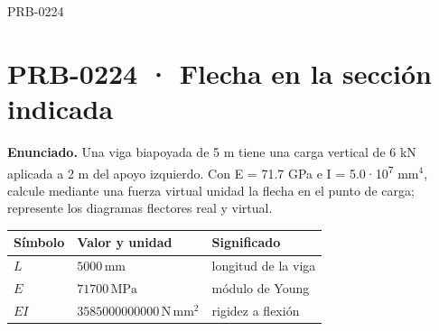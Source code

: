 \Needspace{.3\textheight}

\begin{studiumworked}{PRB-0224}

\section{PRB-0224 · Flecha en la sección indicada}

\textbf{Enunciado.} Una viga biapoyada de 5 m tiene una carga vertical de 6 kN aplicada a 2 m del apoyo izquierdo. Con E = 71.7 GPa e I = 5.0·10\textsuperscript{7} mm$^4$, calcule mediante una fuerza virtual unidad la flecha en el punto de carga; represente los diagramas flectores real y virtual.

\par\medskip\noindent\begin{tabular}{@{}p{.18\linewidth}p{.26\linewidth}p{.48\linewidth}@{}}
\toprule Símbolo & Valor y unidad & Significado\\\midrule
$L$ & $5000\,\mathrm{mm}$ & longitud de la viga\\
$E$ & $71700\,\mathrm{MPa}$ & módulo de Young\\
$EI$ & $3585000000000\,\mathrm{N\,mm^2}$ & rigidez a flexión\\
\bottomrule\end{tabular}\par\medskip


\end{studiumworked}
